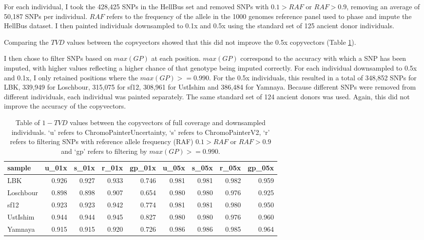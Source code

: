 For each individual, I took the 428,425 SNPs in the HellBus set and removed SNPs with $0.1 > RAF$ or $RAF > 0.9$, removing an average of 50,187 SNPs per individual. $RAF$ refers to the frequency of the allele in the 1000 genomes reference panel used to phase and impute the HellBus dataset. I then painted individuals downsampled to 0.1x and 0.5x using the standard set of 125 ancient donor individuals.  

Comparing the $TVD$ values between the copvyectors showed that this did not improve the 0.5x copyvectors (Table \ref{tab:TVD_table}). 

I then chose to filter SNPs based on $max(GP)$ at each position. $max(GP)$ correspond to the accuracy with which a SNP has been imputed, with higher values reflecting a higher chance of that genotype being imputed correctly. For each individual downsampled to 0.5x and 0.1x, I only retained positions where the $max(GP) >= 0.990$. For the 0.5x individuals, this resulted in a total of 348,852 SNPs for LBK, 339,949 for Loschbour, 315,075 for sf12, 308,961 for UstIshim and 386,484 for Yamnaya. Because different SNPs were removed from different individuals, each individual was painted separately. The same standard set of 124 ancient donors was used. Again, this did not improve the accuracy of the copyvectors. 


\begin{table}
\centering
\begin{tabular}[t]{lrrrrrrrr}
\toprule
sample & u\_01x & s\_01x & r\_01x & gp\_01x & u\_05x & s\_05x & r\_05x & gp\_05x\\
\midrule
LBK & 0.926 & 0.927 & 0.933 & 0.746 & 0.981 & 0.981 & 0.982 & 0.959\\
Loschbour & 0.898 & 0.898 & 0.907 & 0.654 & 0.980 & 0.980 & 0.976 & 0.925\\
sf12 & 0.923 & 0.923 & 0.942 & 0.774 & 0.981 & 0.981 & 0.980 & 0.950\\
UstIshim & 0.944 & 0.944 & 0.945 & 0.827 & 0.980 & 0.980 & 0.976 & 0.960\\
Yamnaya & 0.915 & 0.915 & 0.920 & 0.726 & 0.986 & 0.986 & 0.985 & 0.964\\
\bottomrule
\end{tabular}
\caption{Table of $1-TVD$ values between the copyvectors of full coverage and downsampled individuals. `u' refers to ChromoPainterUncertainty, `s' refers to ChromoPainterV2, `r' refers to filtering SNPs with reference allele frequency (RAF) $0.1 > RAF$ or $RAF > 0.9$ and `gp' refers to filtering by $max(GP) >= 0.990$.}
\label{tab:TVD_table}
\end{table}


